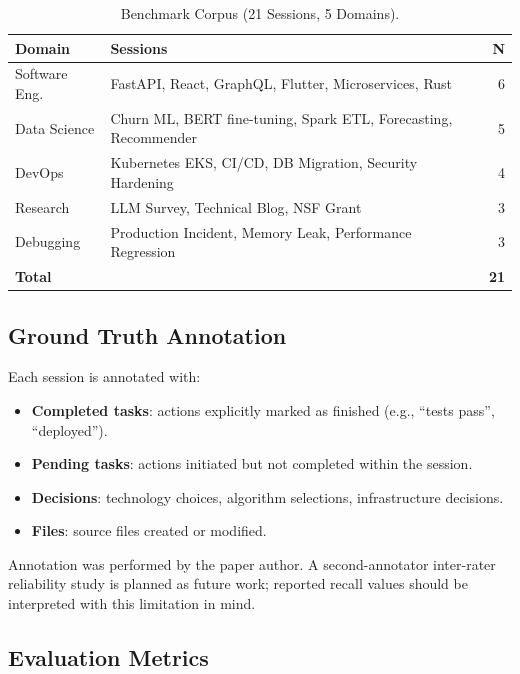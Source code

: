\documentclass[journal]{IEEEtran}
\begin{document}
\begin{table}[t]
  \centering
  \caption{Benchmark Corpus (21 Sessions, 5 Domains).}
  \label{tab:corpus}
  \renewcommand{\arraystretch}{1.2}
  \begin{tabular}{@{}p{2.0cm}p{4.2cm}r@{}}
    \toprule
    \textbf{Domain} & \textbf{Sessions} & \textbf{N} \\
    \midrule
    Software Eng.
      & FastAPI, React, GraphQL, Flutter, Microservices, Rust
      & 6 \\
    Data Science
      & Churn ML, BERT fine-tuning, Spark ETL,
        Forecasting, Recommender
      & 5 \\
    DevOps
      & Kubernetes EKS, CI/CD, DB Migration,
        Security Hardening
      & 4 \\
    Research
      & LLM Survey, Technical Blog, NSF Grant
      & 3 \\
    Debugging
      & Production Incident, Memory Leak,
        Performance Regression
      & 3 \\
    \midrule
    \textbf{Total} & & \textbf{21} \\
    \bottomrule
  \end{tabular}
\end{table}

\subsection{Ground Truth Annotation}

Each session is annotated with:
\begin{itemize}
  \item \textbf{Completed tasks}: actions explicitly marked
    as finished (e.g., ``tests pass'', ``deployed'').
  \item \textbf{Pending tasks}: actions initiated but
    not completed within the session.
  \item \textbf{Decisions}: technology choices, algorithm
    selections, infrastructure decisions.
  \item \textbf{Files}: source files created or modified.
\end{itemize}
Annotation was performed by the paper author.
A second-annotator inter-rater reliability study is planned
as future work; reported recall values should be interpreted
with this limitation in mind.

\subsection{Evaluation Metrics}
\end{document}
